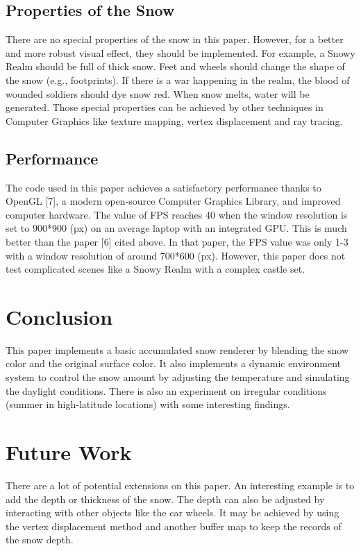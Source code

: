 \documentclass{article}
\begin{document}
\subsection{Properties of the Snow}
There are no special properties of the snow in this paper. However, for a better and more robust visual effect, they should be 
implemented. For example, a Snowy Realm should be full of thick snow. Feet and wheels should change the shape of the snow (e.g.,
footprints). If there is a war happening in the realm, the blood of wounded soldiers should dye snow red. When snow melts, water 
will be generated. Those special properties can be achieved by other techniques in Computer Graphics like texture mapping, vertex
displacement and ray tracing.

\subsection{Performance}
The code used in this paper achieves a satisfactory performance thanks to OpenGL [7], a modern open-source Computer Graphics Library, 
and improved computer hardware. The value of FPS reaches 40 when the window resolution is set to 900*900 (px) on an average laptop 
with an integrated GPU. This is much better than the paper [6] cited above. In that paper, the FPS value was only 1-3 with a window 
resolution of around 700*600 (px). However, this paper does not test complicated scenes like a Snowy Realm with a complex castle set.

\section{Conclusion}
This paper implements a basic accumulated snow renderer by blending the snow color and the original surface color. It also implements 
a dynamic environment system to control the snow amount by adjusting the temperature and simulating the daylight conditions. There is 
also an experiment on irregular conditions (summer in high-latitude locations) with some interesting findings. 

\section{Future Work}
There are a lot of potential extensions on this paper. An interesting example is to add the depth or thickness of the snow. The depth 
can also be adjusted by interacting with other objects like the car wheels. It may be achieved by using the vertex displacement method 
and another buffer map to keep the records of the snow depth.
\end{document}
